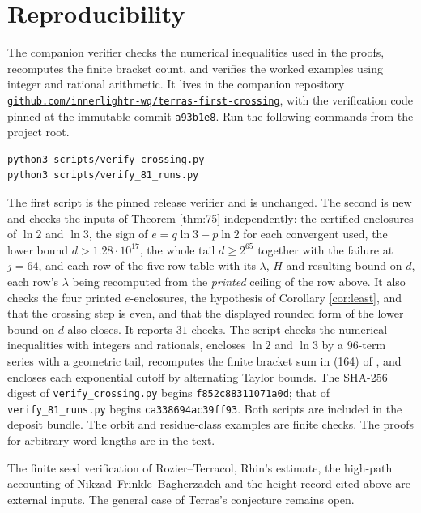 \documentclass[11pt,a4paper]{article}
\theoremstyle{plain}\newtheorem{theorem}{Theorem}\newtheorem{proposition}[theorem]{Proposition}
\theoremstyle{definition}\newtheorem{example}[theorem]{Example}
\theoremstyle{remark}\newtheorem{remark}[theorem]{Remark}
\begin{document}
\section*{Reproducibility}
The companion verifier checks the numerical inequalities used in the proofs,
recomputes the finite bracket count, and verifies the worked examples using integer and
rational arithmetic. It lives in the
companion repository
\href{https://github.com/innerlightr-wq/terras-first-crossing}{\texttt{github.com/innerlightr-wq/\allowbreak terras-first-crossing}}, with the verification
code pinned at the immutable commit
\href{https://github.com/innerlightr-wq/terras-first-crossing/commit/a93b1e82d13fab7024c380ae36320e4ec62a73f9}{\texttt{a93b1e8}}.
Run the following commands from the project root.
\begin{verbatim}
python3 scripts/verify_crossing.py
python3 scripts/verify_81_runs.py
\end{verbatim}
The first script is the pinned release verifier and is unchanged. The second is new and checks
the inputs of Theorem \ref{thm:75} independently: the certified enclosures of $\ln2$ and
$\ln3$, the sign of $e=q\ln3-p\ln2$ for each convergent used, the lower bound
$d>1.28\cdot10^{17}$, the whole tail $d\ge2^{65}$ together with the failure at $j=64$, and each
row of the five-row table with its $\lambda$, $H$ and resulting bound on $d$, each row's
$\lambda$ being recomputed from the \emph{printed} ceiling of the row above. It also checks
the four printed $e$-enclosures, the hypothesis of Corollary \ref{cor:least}, and that the
crossing step is even, and that the displayed rounded form of the lower bound on $d$ also
closes. It reports $31$ checks.
The script checks the numerical inequalities with integers and rationals,
encloses $\ln2$ and $\ln3$ by a 96-term series with a geometric tail, recomputes the
finite bracket sum in (164) of \cite{nfb2026}, and encloses each exponential cutoff by
alternating Taylor bounds. The SHA-256 digest of \texttt{verify\_crossing.py} begins
\texttt{f852c88311071a0d}; that of \texttt{verify\_81\_runs.py} begins
\texttt{ca338694ac39ff93}. Both scripts are included in the deposit bundle. The orbit and residue-class examples are finite checks.
The proofs for arbitrary word lengths are in the text.

The finite seed verification of Rozier--Terracol, Rhin's estimate, the high-path
accounting of Nikzad--Frinkle--Bagherzadeh and the height record cited above are
external inputs. The general case of Terras's conjecture remains open.
\end{document}
